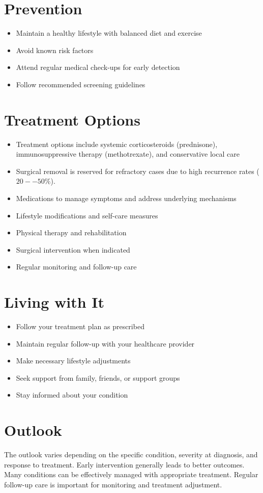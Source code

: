 \section{Prevention}
\begin{itemize}[noitemsep]
  \item Maintain a healthy lifestyle with balanced diet and exercise
  \item Avoid known risk factors
  \item Attend regular medical check-ups for early detection
  \item Follow recommended screening guidelines
\end{itemize}
\section{Treatment Options}
\begin{itemize}[noitemsep]
  \item Treatment options include systemic corticosteroids (prednisone), immunosuppressive therapy (methotrexate), and conservative local care
  \item Surgical removal is reserved for refractory cases due to high recurrence rates ($20--50\%$).
  \item Medications to manage symptoms and address underlying mechanisms
  \item Lifestyle modifications and self-care measures
  \item Physical therapy and rehabilitation
  \item Surgical intervention when indicated
  \item Regular monitoring and follow-up care
\end{itemize}
\section{Living with It}
\begin{itemize}[noitemsep]
  \item Follow your treatment plan as prescribed
  \item Maintain regular follow-up with your healthcare provider
  \item Make necessary lifestyle adjustments
  \item Seek support from family, friends, or support groups
  \item Stay informed about your condition
\end{itemize}
\section{Outlook}
The outlook varies depending on the specific condition, severity at diagnosis, and response to treatment. Early intervention generally leads to better outcomes. Many conditions can be effectively managed with appropriate treatment. Regular follow-up care is important for monitoring and treatment adjustment.
